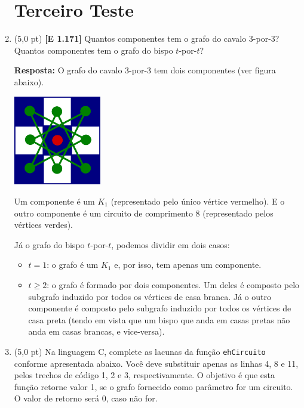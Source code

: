 \documentclass[12pt,a4paper,oneside]{article}
\begin{document}
\begin{enumerate}
	
	\section*{Terceiro Teste}
	
	\item (5,0 pt) {\bf [E 1.171]} Quantos componentes tem o grafo do cavalo 3-por-3? Quantos componentes tem o grafo do bispo $t$-por-$t$?
	
	\vspace*{0.1cm}
	
	{ \color{blue} {\bf Resposta:} O grafo do cavalo 3-por-3 tem dois componentes (ver figura abaixo).
		\begin{center}
			\includegraphics[width=0.3\textwidth]{images/cavalo-3-por-3.png}
		\end{center}
	Um componente é um $K_1$ (representado pelo único vértice vermelho). E o outro componente é um circuito de comprimento 8 (representado pelos vértices verdes).
	
	Já o grafo do bispo $t$-por-$t$, podemos dividir em dois casos:
	\begin{itemize}
		\item \underline{$t=1$}: o grafo é um $K_1$ e, por isso, tem apenas um componente.
		\item \underline{$t \geq 2$}: o grafo é formado por dois componentes. Um deles é composto pelo subgrafo induzido por todos os vértices de casa branca. Já o outro componente é composto pelo subgrafo induzido por todos os vértices de casa preta (tendo em vista que um bispo que anda em casas pretas não anda em casas brancas, e vice-versa).
	\end{itemize}
	}
	
	\newpage
	
	\item (5,0 pt) Na linguagem C, complete as lacunas da função {\tt ehCircuito} conforme apresentada abaixo. Você deve substituir apenas as linhas 4, 8 e 11, pelos trechos de código 1, 2 e 3, respectivamente. O objetivo é que esta função retorne valor 1, se o grafo fornecido como parâmetro for um circuito. O valor de retorno será 0, caso não for.
	

\end{enumerate}
\end{document}
